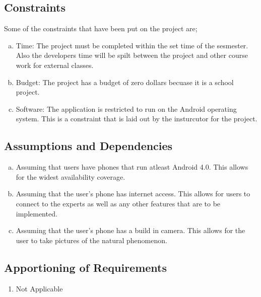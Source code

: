 \documentclass[]{article}
\begin{document}
\subsection{Constraints}

\label{sub:constraints}
Some of the constraints that have been put on the project are;
\begin{enumerate}[a)]
	\item Time: The project must be completed within the set time of the sesmester. Also the developers time will be spilt between the project and other course work for external classes. 
	\item Budget: The project has a budget of zero dollars becuase it is a school project. 
	\item Software: The application is restricted to run on the Android operating system. This is a constraint that is laid out by the insturcutor for the project. 
\end{enumerate}

\subsection{Assumptions and Dependencies}
\label{sub:assumptions_and_dependencies}
\begin{enumerate}[a)]
	\item Assuming that users have phones that run atleast Android 4.0. This allows for the widest availability coverage. 
	\item Assuming that the user's phone has internet access. This allows for users to connect to the experts as well as any other features that are to be implemented.  
	\item Assuming that the user's phone has a build in camera. This allows for the user to take pictures of the natural phenomenon.  
\end{enumerate}

\subsection{Apportioning of Requirements}
\label{sub:apportioning_of_requirements}
\begin{enumerate}
\item Not Applicable
\end{enumerate}
\end{document}
